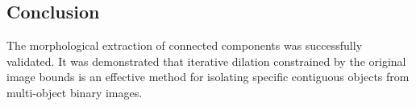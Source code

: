 \documentclass[11pt]{article}
\begin{document}
\subsection{Conclusion}
The morphological extraction of connected components was successfully validated. It was demonstrated that iterative dilation constrained by the original image bounds is an effective method for isolating specific contiguous objects from multi-object binary images.

\pagebreak

\renewcommand{\bibname}{References}

\end{document}
